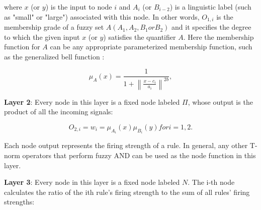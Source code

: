 where $x$ (or $y$) is the input to node $i$ and $A_i$ (or $B_{i-2}$) is a linguistic label (such as "small" or "large") associated with this node. In other words, $O_{1,i}$ is the membership grade of a fuzzy set $A (A_1, A_2, B_1 or B_2)$ and it specifies the degree to which the given input $x$ (or $y$) satisfies the quantifier $A$. Here the membership function for $A$ can be any appropriate parameterized membership function, such as the generalized bell function \cite{jang1997neuro}:

\begin{equation}
\label{eq:bell_anfis}
\mu_{A}(x) = \frac{1}{1 + \left\| \frac{x - c_i}{a_i} \right\|^{2b}},
\end{equation}

\textbf{Layer 2}: Every node in this layer is a fixed node labeled $\Pi$, whose output is the product of all the incoming signals:

\begin{equation}
\label{eq:layer2anfis}
O_{2,i} = w_i = \mu_{A_i}(x)\mu_{B_i}(y) for i = 1,2.
\end{equation}

Each node output represents the firing strength of a rule. In general, any other T-norm operators that perform fuzzy AND can be used as the node function in this layer.

\textbf{Layer 3}: Every node in this layer is a fixed node labeled $N$. The i-th node calculates the ratio of the ith rule's firing strength to the sum of all rules' firing strengths:

